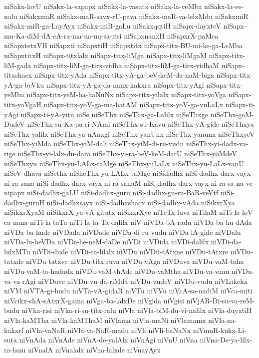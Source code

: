 {niSakx-lavU
niSakx-la-vapapx
niSakx-la-vasutx
niSakx-la-veMba
niSakx-la-ve-nalu
niSakxmaR
niSakx-maR-savx-rU-pava
niSakx-maR-va-lelxMdu
niSakxmiR
niSakx-miR-ga-LayAyx
niSakx-miR-gaLu
niSakxqqtiH
niSapx-dayxteV
niSapx-mu-Ka-diM-dA-cA-ra-ma-na-nu-sa-risi
niSapxnanxH
niSapxrX-paMca
niSapxtetxVH
niSapxti
niSapxtiH
niSapxtitx
niSapx-titx-BU-mi-ke-ga-LeMba
niSapxtitxH
niSapx-titxlalx
niSapx-titx-liMga
niSapx-titx-liMgaM
niSapx-titx-liM-gada
niSapx-titx-liM-ga-tirx-vidha
niSapx-titx-liM-ga-tirx-vidhaM
niSapx-titxshacx
niSapx-titx-yAda
niSapx-titx-yA-ga-beV-keM-da-naM-biga
niSapx-titx-yA-ga-beVku
niSapx-titx-yA-ga-da-nanx-kakxra
niSapx-titx-yAgi
niSapx-titx-yeMba
niSapx-titx-yeM-ba-haNuNx
niSapx-titx-yilalx
niSapx-titx-yoVga
niSapx-titx-yoVgaH
niSapx-titx-yoV-ga-ma-hatAM
niSapx-titx-yoV-ga-vuLaLx
niSapx-ti-yAgi
niSapx-ti-yA-yitu
niSe
niSeThx
niSeThx-ga-Lalilx
niSeThxge
niSeThx-goM-DudeV
niSeThx-su-Ka-pa-ri-NAmi
niSeThx-su-Kavu
niSeThx-yA-gide
niSeThxya
niSeThx-yalilx
niSeThx-ya-nAnxgi
niSeThx-yanUnx
niSeThx-yanunx
niSeThxyeV
niSeThx-yiMda
niSeThx-yiM-dali
niSeThx-yiM-di-ru-vudu
niSeThx-yi-dadx-va-rige
niSeThx-yi-lalx-du-dara
niSeThx-yi-ra-beV-keM-darU
niSeThx-yoMdeV
niSeThxyu
niSeThx-yu-LALx-taMge
niSeThx-yuLaLx
niSeThx-yu-LaLx-vanU
niSeV-dhava
niSethx
niSheThx-yu-LALx-taMge
niSidadhx
niSi-dadhx-darx-vayx-ni-ra-sana
niSi-dadhx-darx-vayx-ni-ra-sanaM
niSi-dadhx-darx-vayx-ni-ra-sa-na-ve-nipapx
niSi-dadhx-gaLU
niSi-dadhx-guru
niSi-dadhx-gu-ru-BaR-veVtf
niSi-dadhx-guruH
niSi-dadhxsayx
niSi-dadhxshacx
niSi-dadhx-vAda
niSikxrXya
niSikxrXyaM
niSikxrX-ya-vA-gitutx
niSikxrXye
niTeTx-luva
niTilaM
niTi-la-loV-ca-nana
niTi-la-taTa
niTi-la-ta-Ta-dalilx
niV
niVDa-bA-radu
niVDa-ba-hu-dAda
niVDa-ba-hude
niVDada
niVDade
niVDa-di-ru-vudu
niVDa-lA-gide
niVDalu
niVDa-lu-beVDa
niVDe-he-neM-daDe
niVDi
niVDida
niVDi-dalilx
niVDi-da-lulxMTu
niVDi-dude
niVDi-ra-lilalx
niVDu
niVDu-tAtxne
niVDu-tAtxre
niVDu-tatxde
niVDu-tatxve
niVDu-titx-ruva
niVDu-vAga
niVDuva
niVDu-vaM-taha
niVDu-vaM-ta-hadudx
niVDu-vaM-thAde
niVDu-vaMtha
niVDu-va-vanu
niVDu-va-va-rAgi
niVDuve
niVDu-vu-da-riMda
niVDu-vudeV
niVDu-vudu
niVLakekx
niVM
niVTA-gi-hudu
niVTa-vA-gidaR
niVTu
niVVu
niVcA-sa-nadiM
niVca-miti
niVcikx-shA-sAtxrX-gama
niVga-ba-lalxDe
niVgida
niVgisi
niVjAR-Di-su-va-reM-budu
niVka-risi
niVka-ri-su-titx-ralu
niVla
niVla-biM-du-vi-nalilx
niVla-duyxtiH
niVla-kaMTha
niVla-kaMThaM
niVlama
niVla-maNi
niVlamamx
niVla-na-kakxrf
niVla-vaNaR
niVla-va-NaR-madu
niVli
niVli-baNaNx
niVmuR-kukx-Li-suta
niVnAda
niVnAde
niVnA-de-yalAlx
niVnAgi
niVnU
niVna
niVna-De-ya-lilx-ra-lanu
niVnalA
niVnalalx
niVna-lalxde
niVnayAyx
}
